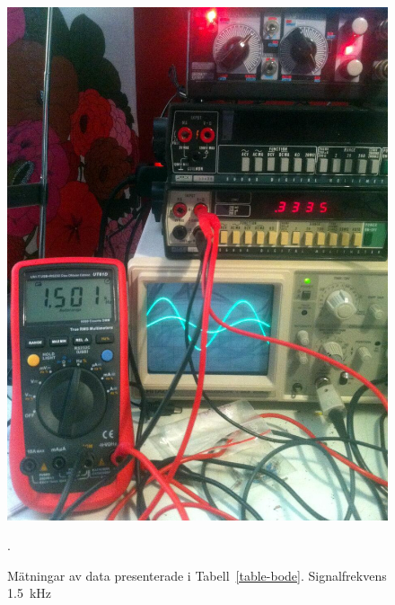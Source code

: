 \begin{figure}\label{fig:bode-foto-1500}
  \centering
  \includegraphics[width=\linewidth]{img/bode_1500Hz.jpg}
  \caption[] {Mätningar av data presenterade i Tabell~\ref{table-bode}.
              Signalfrekvens \SI{1.5}{\kHz}}.
\end{figure}

